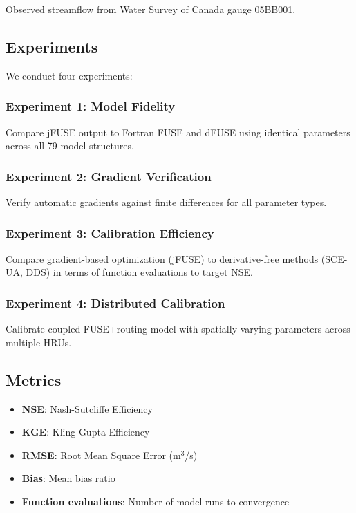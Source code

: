 \documentclass[11pt,a4paper]{article}
\begin{document}
Observed streamflow from Water Survey of Canada gauge 05BB001.

\subsection{Experiments}

We conduct four experiments:

\subsubsection{Experiment 1: Model Fidelity}
Compare jFUSE output to Fortran FUSE and dFUSE using identical parameters across all 79 model structures.

\subsubsection{Experiment 2: Gradient Verification}
Verify automatic gradients against finite differences for all parameter types.

\subsubsection{Experiment 3: Calibration Efficiency}
Compare gradient-based optimization (jFUSE) to derivative-free methods (SCE-UA, DDS) in terms of function evaluations to target NSE.

\subsubsection{Experiment 4: Distributed Calibration}
Calibrate coupled FUSE+routing model with spatially-varying parameters across multiple HRUs.

\subsection{Metrics}

\begin{itemize}
    \item \textbf{NSE}: Nash-Sutcliffe Efficiency
    \item \textbf{KGE}: Kling-Gupta Efficiency
    \item \textbf{RMSE}: Root Mean Square Error (m$^3$/s)
    \item \textbf{Bias}: Mean bias ratio
    \item \textbf{Function evaluations}: Number of model runs to convergence
\end{itemize}
\end{document}

